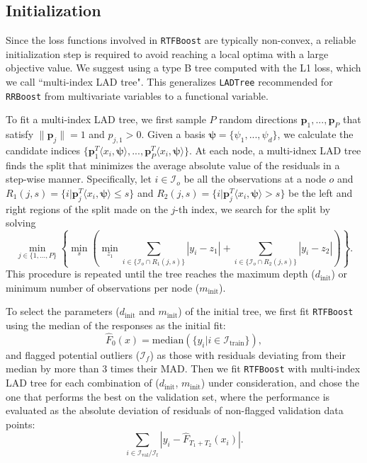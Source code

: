 \documentclass{article}
\begin{document}
\subsection{Initialization}
Since the loss functions involved in \texttt{RTFBoost} are typically non-convex, a reliable initialization step is required to avoid reaching a local optima with a large objective value.  
We suggest using a type B tree computed with the L1 loss, which we call ``multi-index LAD tree".  This generalizes \texttt{LADTree} recommended for \texttt{RRBoost} from multivariate variables to a functional variable. 

To fit a  multi-index  LAD tree, we first sample $P$ random directions ${\mathbf{p}_1,..., \mathbf{p}_P}$ that satisfy 
$\lVert\mathbf{p}_j\rVert = 1$  and $p_{j,1}>0$. Given a basis  $\boldsymbol{\psi} = \{\psi_1, ..., \psi_d\}$, we calculate the candidate indices 
$\{\mathbf{p}_1^T\langle x_i, \boldsymbol{\psi}\rangle,..., \mathbf{p}_P^T\langle x_i, \boldsymbol{\psi}\rangle \}$. At each node, a multi-idnex LAD tree finds the split that minimizes the average absolute value of the residuals in a step-wise manner. Specifically, let $i \in \mathcal{I}_o$ be all the observations at a node $o$ and $R_1(j,s) = \{i| \mathbf{p}_j^T \langle x_i, \boldsymbol{\psi} \rangle \leq s\}$ and $R_2(j,s) = \{i| \mathbf{p}_j^T \langle x_i, \boldsymbol{\psi} \rangle > s\}$  be the left and right regions of the split made on the $j$-th index, we search for the split by solving
$$\min_{j\in \{1,...,P\}} \left \{\min_{s} \left(\min_{z_1} \sum_{i \in \{\mathcal{I}_o \cap R_1(j, s)\}} |y_i - z_1| + \sum_{i \in \{\mathcal{I}_o \cap R_2(j, s)\}}|y_i - z_2| \right) \right \}. $$
This procedure is repeated until the tree reaches the maximum depth ($d_{\text{init}}$) or minimum number of observations per node ($m_{\text{init}}$). 

To select the parameters ($d_{\text{init}}$ and $m_{\text{init}}$) of the initial tree, we first fit \texttt{RTFBoost} using the median of the responses as the initial fit: $$\hat{F}_0(x) = \text{median}( \{y_i| i \in \mathcal{I}_{\text{train}}\}),$$
and flagged potential outliers ($\mathcal{I}_f$) as those with residuals deviating from their median by more than 3 times their MAD. Then we fit \texttt{RTFBoost} with multi-index LAD tree for  each combination of ($d_{\text{init}}$, $m_{\text{init}}$) under consideration,  and chose the one that performs the best on the validation set, where  the performance is evaluated as the absolute deviation of residuals of non-flagged validation data points: 
$$\sum_{i \in \mathcal{I}_{\text{val}}/\mathcal{I}_{\text{f}}} \left|y_i - \hat{F}_{T_1 + T_2}(x_i) \right|.$$
\end{document}
